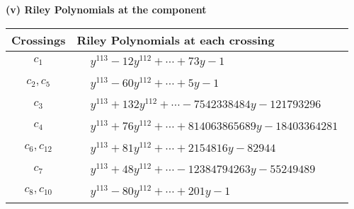 \documentclass[1p]{elsarticle_modified}
\theoremstyle{definition}
\begin{document}
\newpage\renewcommand{\arraystretch}{1}
\flushleft \textbf{(v) Riley Polynomials at the component}\newline \\
\begin{tabular}{m{50pt}|m{274pt}}
Crossings & \hspace{64pt}Riley Polynomials at each crossing \\
\hline $$\begin{aligned}c_{1}\end{aligned}$$&$\begin{aligned}
&y^{113}-12 y^{112}+\cdots+73 y-1
\end{aligned}$\\
\hline $$\begin{aligned}c_{2},c_{5}\end{aligned}$$&$\begin{aligned}
&y^{113}-60 y^{112}+\cdots+5 y-1
\end{aligned}$\\
\hline $$\begin{aligned}c_{3}\end{aligned}$$&$\begin{aligned}
&y^{113}+132 y^{112}+\cdots-7542338484 y-121793296
\end{aligned}$\\
\hline $$\begin{aligned}c_{4}\end{aligned}$$&$\begin{aligned}
&y^{113}+76 y^{112}+\cdots+814063865689 y-18403364281
\end{aligned}$\\
\hline $$\begin{aligned}c_{6},c_{12}\end{aligned}$$&$\begin{aligned}
&y^{113}+81 y^{112}+\cdots+2154816 y-82944
\end{aligned}$\\
\hline $$\begin{aligned}c_{7}\end{aligned}$$&$\begin{aligned}
&y^{113}+48 y^{112}+\cdots-12384794263 y-55249489
\end{aligned}$\\
\hline $$\begin{aligned}c_{8},c_{10}\end{aligned}$$&$\begin{aligned}
&y^{113}-80 y^{112}+\cdots+201 y-1
\end{aligned}$\\

\end{tabular}
\end{document}
